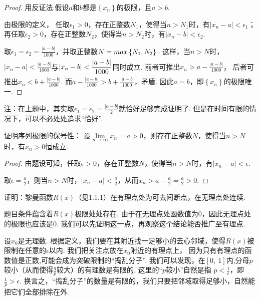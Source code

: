 \begin{proof}
用反证法.假设$a$和$b$都是$\left \{ x_{n}\right \}$的极限，且$a>b$.\par

由极限的定义，
任取$\epsilon_{1}>0$，存在正整数$N_{1}$，使得当$n>N_{1}$时，有$|x_{n}-a|<\epsilon_{1}$；
再任取$\epsilon_{2}>0$，存在正整数$N_{2}$，使得当$n>N_{2}$时，有$|x_{n}-b|<\epsilon_{2}$. \par
\par

取$\epsilon_{1}=\epsilon_{2}=\displaystyle\frac{|a-b|}{1000} $，并取正整数$N=\mathop{max} \left \{N_{1}, N_{2} \right \}\vphantom{\frac{\int}{\int}}$. 这样，当$n>N$时，
$|x_{n}-a|<\displaystyle\frac{|a-b|}{1000}$与$|x_{n}-b|<\displaystyle\frac{|a-b|}{1000}\vphantom{\frac{\int}{\int}}$同时成立. 前者可推出$x_{n}>a-\displaystyle\frac{|a-b|}{1000}$，
后者可推出$x_{n}<b+\displaystyle\frac{|a-b|}{1000}$. 而$a-\displaystyle\frac{|a-b|}{1000}>b+\displaystyle\frac{|a-b|}{1000}$，矛盾. 因此$a=b$，即$\left \{ x_{n}\right \}$的极限唯一.
\end{proof}

注：在上题中，其实取$\epsilon_{1}=\epsilon_{2}=\displaystyle\frac{|a-b|}{2}$就恰好足够完成证明了. 但是在时间有限的情况下，可以不必处处追求“恰好”.

\begin{example}
\label{ex:ch01-03}
证明序列极限的保号性：
设$\lim\limits_{n \to \infty}x_{n}=a>0$，则存在正整数$N$，使得当$n>N$时，有$x_{n}>0$恒成立.
\end{example}

\begin{proof}
由题设可知，任取$\epsilon>0$，存在正整数$N$，使得当$n>N$时，有$|x_{n}-a|<\epsilon$. \par

取$\epsilon=\displaystyle \frac{a}{2} $，则当$n>N$时，$|x_{n}-a|<\displaystyle\frac{a}{2}$，从而$x_{n}>a-\displaystyle\frac{a}{2}=\displaystyle\frac{a}{2}>0$.
\end{proof}

\begin{example}
\label{ex:ch01-04}
证明：黎曼函数$R(x)$（见1.1.1）在有理点处为可去间断点，在无理点处连续.
\end{example}

\begin{analysis}
题目条件蕴含着$R(x)$极限处处存在. 由于在无理点处函数值为$0$，因此无理点处的极限也应该是$0$.
我们可以先证明这一点，再观察这个结论能否推广至有理点.\par

设$x_{0}$是无理数.
根据定义，我们要在其附近找一足够小的去心邻域，使得$R(x)$被限制在任意的$\epsilon$以内.
我们把关注点放在$x_{0}$附近的有理点上，
因为只有有理点的函数值是正数,可能会成为突破限制的“捣乱分子”.
我们可以发现，在$[0,~1]$内,分母$p$较小（从而使得$\frac{q}{p}$较大）的有理数是有限的.
这里的“$p$较小”自然是指
$p < \displaystyle\frac{1}{\epsilon}$，即$\displaystyle\frac{1}{p}>\epsilon$.
换言之，“捣乱分子”的数量是有限的，我们只要把邻域取得足够小，自然能把它们全部排除在外.
\end{analysis}

